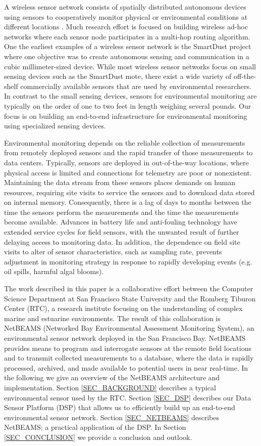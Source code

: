 \documentclass[conference]{IEEEtran}
\begin{document}
A wireless sensor network consists of spatially distributed autonomous
devices using sensors to cooperatively monitor physical or
environmental conditions at different locations \cite{roemer:2004}.
Much research effort is focused on building wireless ad-hoc networks
where each sensor node participates in a multi-hop routing algorithm.
One the earliest examples of a wireless sensor network is the
SmartDust project \cite{smartdust:2001} where one objective was to
create autonomous sensing and communication in a cubic
millimeter-sized device.  While most wireless sensor networks focus on
small sensing devices such as the SmartDust mote, there exist a wide
variety of off-the-shelf commercially available sensors that are used
by environmental researchers. In contrast to the small sensing
devices, sensors for environmental monitoring are typically on the
order of one to two feet in length weighing several pounds. Our
focus is on building an end-to-end infrastructure for environmental
monitoring using specialized sensing devices.

Environmental monitoring depends on the reliable collection of
measurements from remotely deployed sensors and the rapid transfer of
those measurements to data centers. Typically, sensors are deployed in
out-of-the-way locations, where physical access is limited and
connections for telemetry are poor or nonexistent. Maintaining the
data stream from these sensors places demands on human resources,
requiring site visits to service the sensors and to download data
stored on internal memory.  Consequently, there is a lag of days to
months between the time the sensors perform the measurements and the
time the measurements become available. Advances in battery life and
anti-fouling technology have extended service cycles for field
sensors, with the unwanted result of further delaying access to
monitoring data.  In addition, the dependence on field site visits to
alter of sensor characteristics, such as sampling rate, prevents
adjustment in monitoring strategy in response to rapidly developing
events (e.g. oil spills, harmful algal blooms).

The work described in this paper is a collaborative effort between the
Computer Science Department at San Francisco State University and the
Romberg Tiburon Center (RTC), a research institute focusing on the
understanding of complex marine and estuarine environments. The result
of this collaboration is NetBEAMS (Networked Bay Environmental
Assessment Monitoring System), an environmental sensor network
deployed in the San Francisco Bay. NetBEAMS provides means to program
and interrogate sensors at the remote field locations and to transmit
collected measurements to a database, where the data is rapidly
processed, archived, and made available to potential users in near
real-time. In the following we give an overview of the NetBEAMS
architecture and implementation.  Section \ref{SEC_BACKGROUND}
describes a typical environmental sensor used by the RTC. Section
\ref{SEC_DSP} describes our Data Sensor Platform (DSP) that allows us
to efficiently build up an end-to-end environmental sensor network.
Section \ref{SEC_NETBEAMS} describes NetBEAMS; a practical application
of the DSP. In Section \ref{SEC_CONCLUSION} we provide a conclusion
and outlook.
\end{document}
